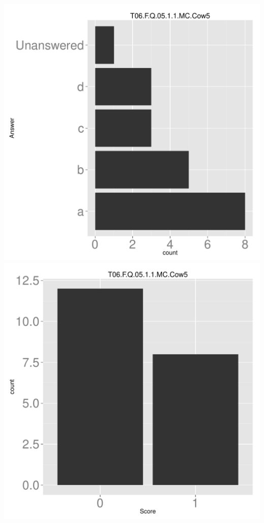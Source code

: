 \documentclass[12pt,english,nohyper]{tufte-handout}\usepackage[]{graphicx}\usepackage[]{color}
\begin{document}
\begin{center} \includegraphics[width=.45\linewidth]{Topic06_AB_69_answer} \includegraphics[width=.45\linewidth]{Topic06_AB_69_score} \end{center} 
\end{document}
